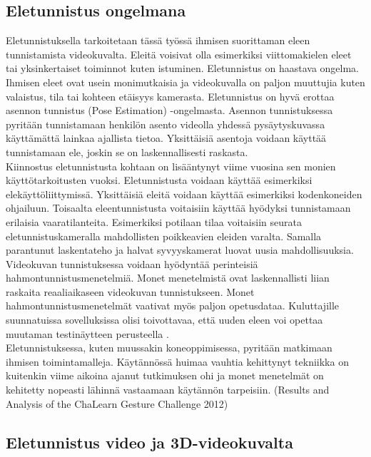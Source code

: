 \subsection{Eletunnistus ongelmana}
Eletunnistuksella tarkoitetaan tässä työssä ihmisen suorittaman eleen tunnistamista videokuvalta. Eleitä voisivat olla esimerkiksi
viittomakielen eleet tai yksinkertaiset toiminnot kuten istuminen. Eletunnistus on haastava ongelma. Ihmisen eleet ovat usein 
monimutkaisia ja videokuvalla on paljon muuttujia kuten valaistus, tila tai kohteen etäisyys kamerasta.\citep {1251144} Eletunnistus on hyvä erottaa
asennon tunnistus (Pose Estimation) -ongelmasta. Asennon tunnistuksessa pyritään tunnistamaan henkilön asento videolla yhdessä pysäytyskuvassa
käyttämättä lainkaa ajallista tietoa. \citep {hirsjarvilol2009} Yksittäisiä asentoja voidaan käyttää tunnistamaan ele, joskin se on laskennallisesti raskasta.\\
Kiinnostus eletunnistusta kohtaan on lisääntynyt viime vuosina sen monien käyttötarkoitusten vuoksi. Eletunnistusta voidaan käyttää esimerkiksi elekäyttöliittymissä.
\citep {1251144} Yksittäisiä eleitä voidaan käyttää esimerkiksi kodenkoneiden ohjailuun. Toisaalta eleentunnistusta voitaisiin käyttää hyödyksi tunnistamaan
erilaisia vaaratilanteita. Esimerkiksi potilaan tilaa voitaisiin seurata eletunnistuskameralla mahdollisten poikkeavien eleiden varalta.
Samalla parantunut laskentateho ja halvat syvyyskamerat luovat uusia mahdollisuuksia.\citep {6239178}\\

Videokuvan tunnistuksessa voidaan hyödyntää perinteisiä hahmontunnistusmenetelmiä. Monet menetelmistä ovat laskennallisti liian raskaita 
reaaliaikaseen videokuvan tunnistukseen. \citep {1251144} Monet hahmontunnistusmenetelmät vaativat myös paljon opetusdataa. Kuluttajille suunnatuissa
sovelluksissa olisi toivottavaa, että uuden eleen voi opettaa muutaman testinäytteen perusteella \citep {1251144}.\\

Eletunnistuksessa, kuten muussakin koneoppimisessa, pyritään matkimaan ihmisen toimintamalleja. Käytännössä huimaa vauhtia kehittynyt tekniikka on kuitenkin
viime aikoina ajanut tutkimuksen ohi ja monet menetelmät on kehitetty nopeasti lähinnä vastaamaan käytännön tarpeisiin. (Results and Analysis of the ChaLearn Gesture Challenge 2012)


\subsection{Eletunnistus video ja 3D-videokuvalta}

